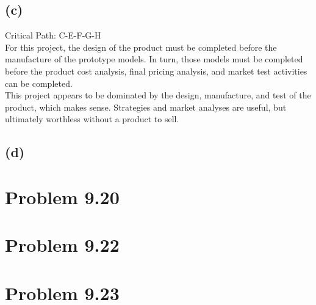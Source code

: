 \documentclass{article}
\begin{document}
	\subsection*{(c)}
	Critical Path: C-E-F-G-H\\
	For this project, the design of the product must be completed before the manufacture of the prototype models. In turn, those models must be completed before the product cost analysis, final pricing analysis, and market test activities can be completed.\\
	This project appears to be dominated by the design, manufacture, and test of the product, which makes sense. Strategies and market analyses are useful, but ultimately worthless without a product to sell.
	\subsection*{(d)}
	\begin{center}
	\makebox[\textwidth]{
		}
	\end{center}
	
	\section*{Problem 9.20}
		
	\section*{Problem 9.22}
	
	\section*{Problem 9.23}
	
\end{document}
